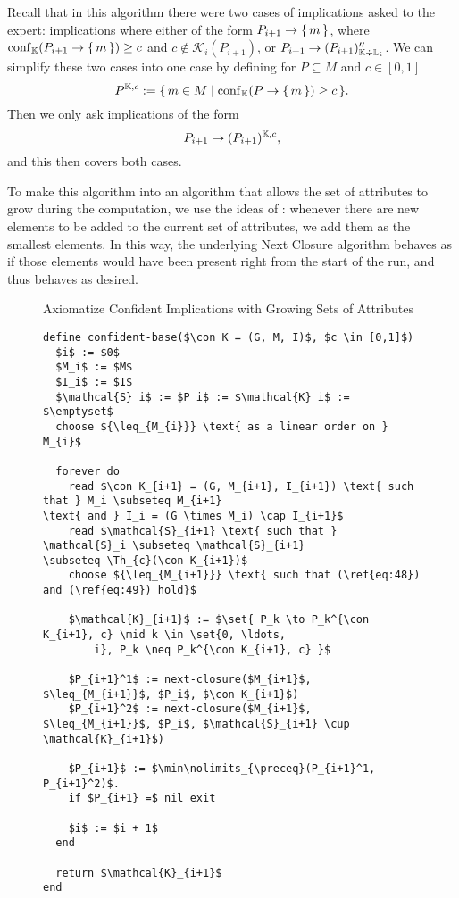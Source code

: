 Recall that in this algorithm there were two cases of implications asked to the expert:
implications where either of the form $P_{i+1} \to {\ensuremath{\{\,m\,\}}}$, where $\operatorname{conf}_{{\mathbb{K}}}(P_{i+1}
\to {\ensuremath{\{\,m\,\}}}) \ge c$ and $c \notin \mathcal{K}_{i}(P_{i+1})$, or $P_{i+1} \to
(P_{i+1})_{{\mathbb{K}} \div {\ensuremath{\mathbb{L}}}_{i}}''$.  We can simplify these two cases into one case by
defining for $P \subseteq M$ and $c \in [0,1]$
\begin{equation*}
  P^{{\mathbb{K}}, c} := {\{\, m \in M \mid \operatorname{conf}_{{\mathbb{K}}}(P \to {\ensuremath{\{\,m\,\}}}) \ge c \,\}}.
\end{equation*}
Then we only ask implications of the form
\begin{equation*}
  P_{i+1} \to (P_{i+1})^{{\mathbb{K}}, c},
\end{equation*}
and this then covers both cases.

To make this algorithm into an algorithm that allows the set of attributes to grow during
the computation, we use the ideas of : whenever there are new
elements to be added to the current set of attributes, we add them as the smallest
elements.  In this way, the underlying Next Closure algorithm behaves as if those elements
would have been present right from the start of the run, and thus behaves as desired.


\begin{figure}[tp]
  \begin{Algorithm} Axiomatize Confident Implications with Growing Sets of Attributes
    \hspace*{0cm}
    \label{alg:confident-base/growing-attributes}
    \begin{lstlisting}
define confident-base($\con K = (G, M, I)$, $c \in [0,1]$)
  $i$ := $0$
  $M_i$ := $M$
  $I_i$ := $I$
  $\mathcal{S}_i$ := $P_i$ := $\mathcal{K}_i$ := $\emptyset$
  choose ${\leq_{M_{i}}} \text{ as a linear order on } M_{i}$
  
  forever do
    read $\con K_{i+1} = (G, M_{i+1}, I_{i+1}) \text{ such that } M_i \subseteq M_{i+1}
\text{ and } I_i = (G \times M_i) \cap I_{i+1}$
    read $\mathcal{S}_{i+1} \text{ such that } \mathcal{S}_i \subseteq \mathcal{S}_{i+1}
\subseteq \Th_{c}(\con K_{i+1})$
    choose ${\leq_{M_{i+1}}} \text{ such that (\ref{eq:48}) and (\ref{eq:49}) hold}$

    $\mathcal{K}_{i+1}$ := $\set{ P_k \to P_k^{\con K_{i+1}, c} \mid k \in \set{0, \ldots,
        i}, P_k \neq P_k^{\con K_{i+1}, c} }$

    $P_{i+1}^1$ := next-closure($M_{i+1}$, $\leq_{M_{i+1}}$, $P_i$, $\con K_{i+1}$)
    $P_{i+1}^2$ := next-closure($M_{i+1}$, $\leq_{M_{i+1}}$, $P_i$, $\mathcal{S}_{i+1} \cup \mathcal{K}_{i+1}$)

    $P_{i+1}$ := $\min\nolimits_{\preceq}(P_{i+1}^1, P_{i+1}^2)$.
    if $P_{i+1} =$ nil exit

    $i$ := $i + 1$
  end

  return $\mathcal{K}_{i+1}$  
end
    \end{lstlisting}
  \end{Algorithm}
\end{figure}

